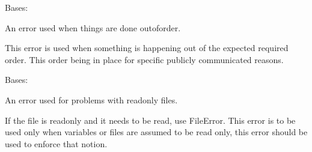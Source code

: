 \documentclass[letterpaper,11pt,english]{sphinxmanual}
\begin{document}

\begin{savenotes}\begin{fulllineitems}
\label{\detokenize{code/lezargus.library.logging:lezargus.library.logging.OutOfOrderError}}
\pysigstartsignatures
{}
\pysigstopsignatures
\sphinxAtStartPar
Bases: {\hyperref[\detokenize{code/lezargus.library.logging:lezargus.library.logging.LezargusError}]{}}

\sphinxAtStartPar
An error used when things are done out\sphinxhyphen{}of\sphinxhyphen{}order.

\sphinxAtStartPar
This error is used when something is happening out of the expected required
order. This order being in place for specific publicly communicated
reasons.

\end{fulllineitems}\end{savenotes}


\begin{savenotes}\begin{fulllineitems}
\label{\detokenize{code/lezargus.library.logging:lezargus.library.logging.ReadOnlyError}}
\pysigstartsignatures
{}
\pysigstopsignatures
\sphinxAtStartPar
Bases: {\hyperref[\detokenize{code/lezargus.library.logging:lezargus.library.logging.LezargusError}]{}}

\sphinxAtStartPar
An error used for problems with read\sphinxhyphen{}only files.

\sphinxAtStartPar
If the file is read\sphinxhyphen{}only and it needs to be read, use FileError. This
error is to be used only when variables or files are assumed to be read
only, this error should be used to enforce that notion.

\end{fulllineitems}\end{savenotes}

\end{document}
